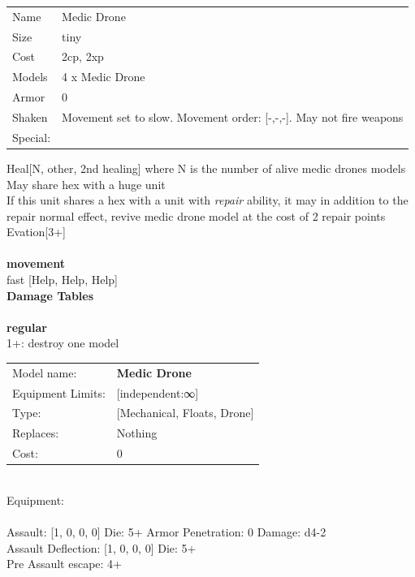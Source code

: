 \begin{tabular}{ll}
  Name & Medic Drone \\
  Size & tiny\\
  Cost & 2cp, 2xp\\
  Models & 4 x Medic Drone\\
  Armor & 0\\
  Shaken & Movement set to slow. Movement order: [-,-,-]. May not fire weapons\\
  Special: \\
\end{tabular}

\noindent Heal[N, other, 2nd healing] where N is the number of alive medic drones models\\ 
May share hex with a huge unit\\ 
If this unit shares a hex with a unit with {{\it repair}} ability, it may in addition to the repair normal effect, revive medic drone model at the cost of 2 repair points\\ 
Evation[3+]\\ 


\ \\ {\bf movement } \\
fast [Help, Help, Help] \\


{\bf Damage Tables} \\
\ \\ {\bf regular } \\
1+: destroy one model \\


\noindent
\begin{tabular}{ll}
Model name: &{\bf Medic Drone } \\
Equipment Limits: &[independent:∞] \\
Type: &[Mechanical, Floats, Drone] \\
Replaces: &Nothing \\
Cost: & 0\\
\end{tabular}
\ \\
Equipment:  \\
\ \\
Assault: [1, 0, 0, 0] Die: 5+ Armor Penetration: 0 Damage: d4-2 \\
Assault Deflection: [1, 0, 0, 0] Die: 5+\\
\indent Pre Assault escape: 4+\\ 
 
\ \\

